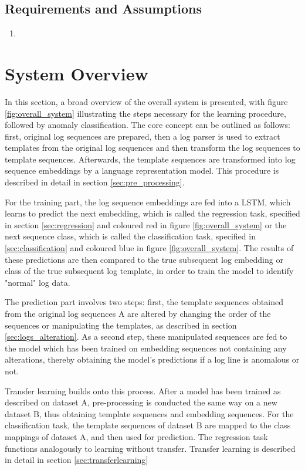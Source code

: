 \subsection{Requirements and Assumptions}
\begin{enumerate}
	\item 
\end{enumerate}



\section{System Overview \label{sec:overall_system}}
In this section, a broad overview of the overall system is presented, with figure \ref{fig:overall_system} illustrating the steps necessary for the learning procedure, followed by anomaly classification. 
The core concept can be outlined as follows: first, original log sequences are prepared, then a log parser is used to extract templates from the original log sequences and then transform the log sequences to template sequences. Afterwards, the template sequences are transformed into log sequence embeddings by a language representation model. This procedure is described in detail in section \ref{sec:pre_processing}. 

For the training part, the log sequence embeddings are fed into a LSTM, which learns to predict the next embedding, which is called the regression task, specified in section \ref{sec:regression} and coloured red in figure \ref{fig:overall_system} or the next sequence class, which is called the classification task, specified in \ref{sec:classification} and coloured blue in figure \ref{fig:overall_system}. The results of these predictions are then compared to the true subsequent log embedding or class of the true subsequent log template, in order to train the model to identify "normal" log data.

The prediction part involves two steps: first, the template sequences obtained from the original log sequences A are altered by changing the order of the sequences or manipulating the templates, as described in section \ref{sec:logs_alteration}. As a second step, these manipulated sequences are fed to the model which has been trained on embedding sequences not containing any alterations, thereby obtaining the model's predictions if a log line is anomalous or not.

Transfer learning builds onto this process. After a model has been trained as described on dataset A, pre-processing is conducted the same way on a new dataset B, thus obtaining template sequences and embedding sequences. For the classification task, the template sequences of dataset B are mapped to the class mappings of dataset A, and then used for prediction. The regression task functions analogously to learning without transfer. Transfer learning is described in detail in section \ref{sec:transferlearning}

